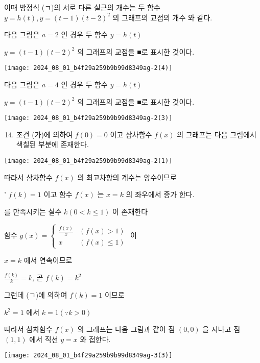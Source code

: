 \documentclass[10pt]{article}
\begin{document}
이때 방정식 (ㄱ)의 서로 다른 실근의 개수는 두 함수 $y=h(t), y=(t-1)(t-2)^{2}$ 의 그래프의 교점의 개수 와 같다.

다음 그림은 $a=2$ 인 경우 두 함수 $y=h(t)$

$y=(t-1)(t-2)^{2}$ 의 그래프의 교점을 ■로 표시한 것이다.

\begin{center}
\texttt{[image: 2024\_08\_01\_b4f29a259b9b99d8349ag-2(4)]}
\end{center}

다음 그림은 $a=4$ 인 경우 두 함수 $y=h(t)$

$y=(t-1)(t-2)^{2}$ 의 그래프의 교점을 ■로 표시한 것이다.

\begin{center}
\texttt{[image: 2024\_08\_01\_b4f29a259b9b99d8349ag-2(3)]}
\end{center}

\begin{enumerate}
  \setcounter{enumi}{13}
  \item 조건 (가)에 의하여 $f(0)=0$ 이고 삼차함수 $f(x)$ 의 그래프는 다음 그림에서 색칠된 부분에 존재한다.
\end{enumerate}

\begin{center}
\texttt{[image: 2024\_08\_01\_b4f29a259b9b99d8349ag-2(1)]}
\end{center}

따라서 삼차함수 $f(x)$ 의 최고차항의 계수는 양수이므로

' $f(k)=1$ 이고 함수 $f(x)$ 는 $x=k$ 의 좌우에서 증가 한다.

를 만족시키는 실수 $k(0<k \leq 1)$ 이 존재한다

함수 $g(x)=\left\{\begin{array}{ll}\frac{f(x)}{x} & (f(x)>1) \\ x & (f(x) \leq 1)\end{array}\right.$ 이

$x=k$ 에서 연속이므로

$\frac{f(k)}{k}=k$, 곧 $f(k)=k^{2}$

그런데 (ㄱ)에 의하여 $f(k)=1$ 이므로

$k^{2}=1$ 에서 $k=1(\because k>0)$

따라서 삼차함수 $f(x)$ 의 그래프는 다음 그림과 같이 점 $(0,0)$ 을 지나고 점 $(1,1)$ 에서 직선 $y=x$ 와 접한다.

\begin{center}
\texttt{[image: 2024\_08\_01\_b4f29a259b9b99d8349ag-3(3)]}
\end{center}
\end{document}
